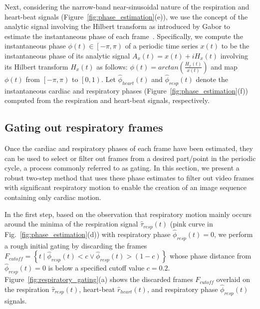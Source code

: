 \documentclass[journal]{IEEEtran}
\begin{document}
	Next, considering the narrow-band near-sinusoidal nature of the respiration and heart-beat signals (Figure~\ref{fig:phase_estimation}(e)), we use the concept of the analytic signal involving the Hilbert transform as introduced by Gabor to estimate the instantaneous phase of each frame~\cite{Gabor1946,Bracewell1986,Rosenblum2001,Freund2003,Kuklik2015}. Specifically, we compute the instantaneous phase $\phi(t) \in \left [  -\pi, \pi\right )$ of a periodic time series $x(t)$ to be the instantaneous phase of its analytic signal $A_x(t) = x(t) + i H_x(t)$ involving its Hilbert transform $H_x(t)$ as follows: $\phi(t) = arctan \left( \frac{H_x(t)}{x(t)}\right)$ and map $\phi(t)$ from $\left [  -\pi, \pi\right )$ to $\left [  0, 1\right )$. Let $\hat{\phi}_{heart}(t)$ and $\hat{\phi}_{resp}(t)$ denote the instantaneous cardiac and respiratory phases (Figure~\ref{fig:phase_estimation}(f)) computed from the respiration and heart-beat signals, respectively.
%
\subsection{Gating out respiratory frames}
\label{sec:method:gating}
%
Once the cardiac and respiratory phases of each frame have been estimated, they can be used to select or filter out frames from a desired part/point in the periodic cycle, a process commonly referred to as gating. In this section, we present a robust two-step method that uses these phase estimates to filter out video frames with significant respiratory motion to enable the creation of an image sequence containing only cardiac motion.

	In the first step, based on the observation that respiratory motion mainly occurs around the minima of the respiration signal $\hat{\tau}_{resp}(t)$ (pink curve in Fig.~\ref{fig:phase_estimation}(d)) with respiratory phase $\hat{\phi}_{resp}(t) = 0$, we perform a rough initial gating by discarding the frames $F_{cutoff} = \left \{ t \mid \hat{\phi}_{resp}(t) < c \vee \hat{\phi}_{resp}(t) > (1 - c) \right \}$ whose phase distance from $\hat{\phi}_{resp}(t) = 0$ is below a specified cutoff value $c=0.2$. Figure~\ref{fig:respiratory_gating}(a) shows the discarded frames $F_{cutoff}$ overlaid on the respiration $\hat{\tau}_{resp}(t)$, heart-beat  $\hat{r}_{heart}(t)$, and respiratory phase $\hat{\phi}_{resp}(t)$ signals.
\end{document}
